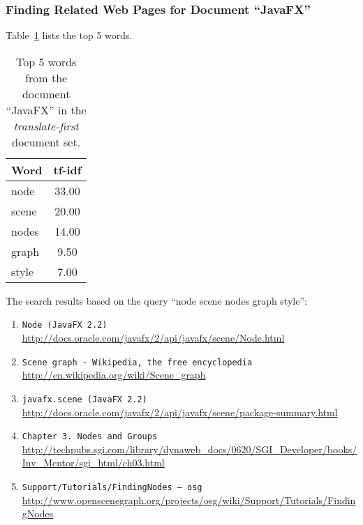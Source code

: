 \subsubsection{Finding Related Web Pages for Document ``JavaFX''}
\label{subsubsec:en-javafx}

Table~\ref{tab:topWords-en-javafx} lists the top 5 words.
\begin{table}[H]
\centering
\begin{tabular}{|l|c|}
\hline\hline
    Word & tf-idf \\
\hline
    node & 33.00 \\
    scene & 20.00 \\
    nodes & 14.00 \\
    graph & 9.50 \\
    style & 7.00 \\
\hline\hline
\end{tabular}
\caption{Top 5 words from the document ``JavaFX'' in the \textit{translate-first} document set.}
\label{tab:topWords-en-javafx}
\end{table}

The search results based on the query ``node scene nodes graph style'':

\begin{enumerate}
\item
    \verb|Node (JavaFX 2.2)| \\
    \url{http://docs.oracle.com/javafx/2/api/javafx/scene/Node.html}
\item
    \verb|Scene graph - Wikipedia, the free encyclopedia| \\
    \url{http://en.wikipedia.org/wiki/Scene_graph}
\item
    \verb|javafx.scene (JavaFX 2.2)| \\
    \url{http://docs.oracle.com/javafx/2/api/javafx/scene/package-summary.html}
\item
    \verb|Chapter 3. Nodes and Groups| \\
    \url{http://techpubs.sgi.com/library/dynaweb_docs/0620/SGI_Developer/books/Inv_Mentor/sgi_html/ch03.html}
\item
    \verb|Support/Tutorials/FindingNodes – osg| \\
    \url{http://www.openscenegraph.org/projects/osg/wiki/Support/Tutorials/FindingNodes}
\end{enumerate}

